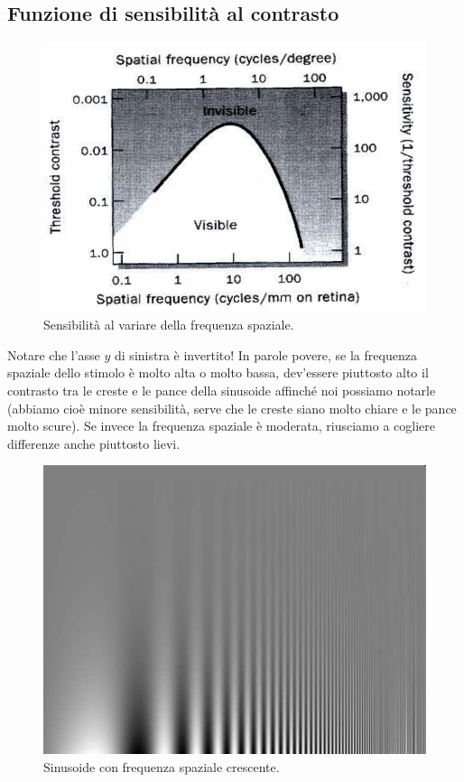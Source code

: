 \documentclass[a4paper,11pt]{article}
\begin{document}
\newpage

\subsection{Funzione di sensibilità al contrasto}

\renewcommand{\thefigure}{2.13}
\begin{figure}[!h]
  \centering
    \includegraphics[scale=0.5]{images/2/sensitivity_vs_spatial_freq.png}
    \caption{Sensibilità al variare della frequenza spaziale.}
\end{figure}

Notare che l'asse $y$ di sinistra è invertito! In parole povere, se la frequenza spaziale dello stimolo è molto alta o molto bassa,
dev'essere piuttosto alto il contrasto tra le creste e le pance della sinusoide affinché noi possiamo notarle (abbiamo cioè minore sensibilità, serve che le creste siano molto chiare e
le pance molto scure). Se invece la frequenza spaziale è moderata, riusciamo a cogliere differenze anche piuttosto lievi.

\renewcommand{\thefigure}{2.14}
\begin{figure}[!h]
  \centering
    \includegraphics[scale=0.4]{images/2/spatial_sinusoid.png}
    \caption{Sinusoide con frequenza spaziale crescente.}
\end{figure}
\end{document}
